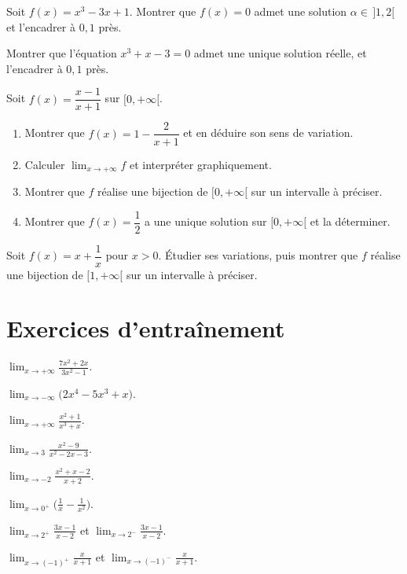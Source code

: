 \exo{} Soit $f(x)=x^{3}-3x+1$. Montrer que $f(x)=0$ admet une solution $\alpha\in\,]1,2[$ et l'encadrer à $0{,}1$ près.

\exo{} Montrer que l'équation $x^{3}+x-3=0$ admet une unique solution réelle, et l'encadrer à $0{,}1$ près.

\exo{} Soit $f(x)=\dfrac{x-1}{x+1}$ sur $[0,+\infty[$.
\begin{enumerate}[label=\arabic*)]
\item Montrer que $f(x)=1-\dfrac{2}{x+1}$ et en déduire son sens de variation.
\item Calculer $\displaystyle\lim_{x\to+\infty}f$ et interpréter graphiquement.
\item Montrer que $f$ réalise une bijection de $[0,+\infty[$ sur un intervalle à préciser.
\item Montrer que $f(x)=\dfrac12$ a une unique solution sur $[0,+\infty[$ et la déterminer.
\end{enumerate}

\exo{} Soit $f(x)=x+\dfrac1x$ pour $x>0$. Étudier ses variations, puis montrer que $f$ réalise une bijection de $[1,+\infty[$ sur un intervalle à préciser.

\section{Exercices d'entraînement}

\exo{} $\displaystyle\lim_{x\to+\infty}\frac{7x^{2}+2x}{3x^{2}-1}$.

\exo{} $\displaystyle\lim_{x\to-\infty}\big(2x^{4}-5x^{3}+x\big)$.

\exo{} $\displaystyle\lim_{x\to+\infty}\frac{x^{2}+1}{x^{3}+x}$.

\exo{} $\displaystyle\lim_{x\to3}\frac{x^{2}-9}{x^{2}-2x-3}$.

\exo{} $\displaystyle\lim_{x\to-2}\frac{x^{2}+x-2}{x+2}$.

\exo{} $\displaystyle\lim_{x\to0^{+}}\Big(\frac1x-\frac1{x^{2}}\Big)$.

\exo{} $\displaystyle\lim_{x\to2^{+}}\frac{3x-1}{x-2}$ et $\displaystyle\lim_{x\to2^{-}}\frac{3x-1}{x-2}$.

\exo{} $\displaystyle\lim_{x\to(-1)^{+}}\frac{x}{x+1}$ et $\displaystyle\lim_{x\to(-1)^{-}}\frac{x}{x+1}$.

